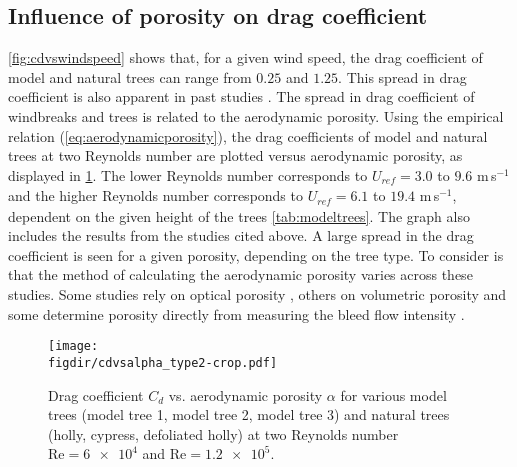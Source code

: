 \subsection{Influence of porosity on drag coefficient}
\label{subsec:porosity}
\cref{fig:cdvswindspeed} shows that, for a given wind speed, the drag coefficient of model and natural trees can range from $0.25$ and $1.25$. This spread in drag coefficient is also apparent in past studies \citep{Bitog2011b,Dong2007,Guan2003,Hagen1971,Rudnicki2004,Vollsinger2005,Wilson1985}. The spread in drag coefficient of windbreaks and trees is related to the aerodynamic porosity. Using the empirical relation (\cref{eq:aerodynamicporosity}), the drag coefficients of model and natural trees at two Reynolds number are plotted versus aerodynamic porosity, as displayed in \cref{fig:cdvsalpha}. The lower Reynolds number corresponds to $U_{\textit{ref}}=3.0$ to $9.6$ m\,s$^{-1}$ and the higher Reynolds number corresponds to $U_{\textit{ref}}=6.1$ to $19.4$ m\,s$^{-1}$, dependent on the given height of the trees \cref{tab:modeltrees}. The graph also includes the results from the studies cited above. A large spread in the drag coefficient is seen for a given porosity, depending on the tree type. To consider is that the method of calculating the aerodynamic porosity varies across these studies. Some studies rely on optical porosity \citep{Dong2008,Guan2003,Hagen1971,Wilson1985}, others on volumetric porosity \citep{Grant1998} and some determine porosity directly from measuring the bleed flow intensity \citep{Bitog2011b}.

	\begin{figure}[t]
	\centering
	\texttt{[image: \\figdir/cdvsalpha\_type2-crop.pdf]}
	\caption{Drag coefficient $C_d$ vs. aerodynamic porosity $\alpha$ for various model trees (model tree 1, model tree 2, model tree 3) and natural trees (holly, cypress, defoliated holly) at two Reynolds number $\mathrm{Re} = \num{6e4}$ and $\mathrm{Re}=\num{1.2e5}$.}
	\label{fig:cdvsalpha}
	\end{figure}

